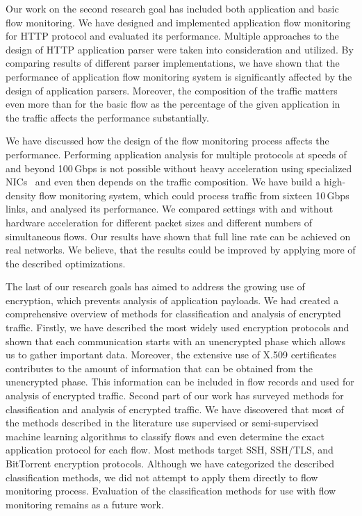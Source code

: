 Our work on the second research goal has included both application and basic flow monitoring. We have designed and implemented application flow monitoring for HTTP protocol and evaluated its performance. Multiple approaches to the design of HTTP application parser were taken into consideration and utilized. By comparing results of different parser implementations, we have shown that the performance of application flow monitoring system is significantly affected by the design of application parsers. Moreover, the composition of the traffic matters even more than for the basic flow as the percentage of the given application in the traffic affects the performance substantially.

We have discussed how the design of the flow monitoring process affects the performance. Performing application analysis for multiple protocols at speeds of and beyond 100\,Gbps is not possible without heavy acceleration using specialized NICs~\cite{Kekely-2016-Software} and even then depends on the traffic composition. We have build a high-density flow monitoring system, which could process traffic from sixteen 10\,Gbps links, and analysed its performance. We compared settings with and without hardware acceleration for different packet sizes and different numbers of simultaneous flows. Our results have shown that full line rate can be achieved on real networks. We believe, that the results could be improved by applying more of the described optimizations.

The last of our research goals has aimed to address the growing use of encryption, which prevents analysis of application payloads. We had created a comprehensive overview of methods for classification and analysis of encrypted traffic. Firstly, we have described the most widely used encryption protocols and shown that each communication starts with an unencrypted phase which allows us to gather important data. Moreover, the extensive use of X.509 certificates contributes to the amount of information that can be obtained from the unencrypted phase. This information can be included in flow records and used for analysis of encrypted traffic. Second part of our work has surveyed methods for classification and analysis of encrypted traffic. We have discovered that most of the methods described in the literature use supervised or semi-supervised machine learning algorithms to classify flows and even determine the exact application protocol for each flow. Most methods target SSH, SSH/TLS, and BitTorrent encryption protocols. Although we have categorized the described classification methods, we did not attempt to apply them directly to flow monitoring process. Evaluation of the classification methods for use with flow monitoring remains as a future work.


